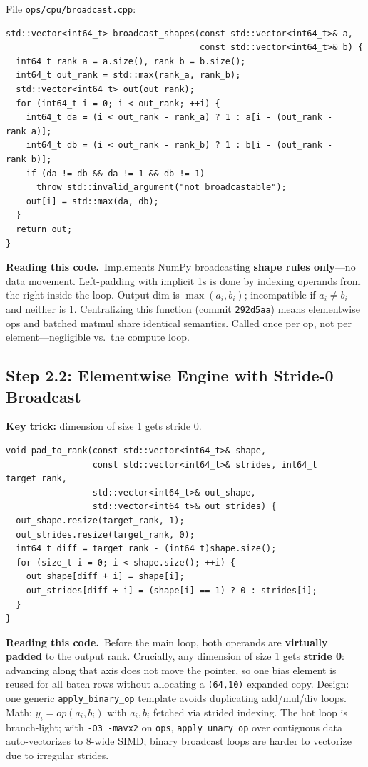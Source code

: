 \documentclass[11pt,a4paper]{article}
\newcommand{\explain}{\par\smallskip\noindent}
\newcommand{\exhead}{\textbf{Reading this code.}\ }
\begin{document}
File \texttt{ops/cpu/broadcast.cpp}:
\begin{lstlisting}[style=cpp]
std::vector<int64_t> broadcast_shapes(const std::vector<int64_t>& a,
                                      const std::vector<int64_t>& b) {
  int64_t rank_a = a.size(), rank_b = b.size();
  int64_t out_rank = std::max(rank_a, rank_b);
  std::vector<int64_t> out(out_rank);
  for (int64_t i = 0; i < out_rank; ++i) {
    int64_t da = (i < out_rank - rank_a) ? 1 : a[i - (out_rank - rank_a)];
    int64_t db = (i < out_rank - rank_b) ? 1 : b[i - (out_rank - rank_b)];
    if (da != db && da != 1 && db != 1)
      throw std::invalid_argument("not broadcastable");
    out[i] = std::max(da, db);
  }
  return out;
}
\end{lstlisting}
\explain\exhead Implements NumPy broadcasting \textbf{shape rules only}---no data movement.
Left-padding with implicit 1s is done by indexing operands from the right inside the loop.
Output dim is $\max(a_i,b_i)$; incompatible if $a_i \neq b_i$ and neither is 1. Centralizing
this function (commit \texttt{292d5aa}) means elementwise ops and batched matmul share identical
semantics. Called once per op, not per element---negligible vs.\ the compute loop.

\subsection{Step 2.2: Elementwise Engine with Stride-0 Broadcast}

\textbf{Key trick:} dimension of size 1 gets stride 0.

\begin{lstlisting}[style=cpp]
void pad_to_rank(const std::vector<int64_t>& shape,
                 const std::vector<int64_t>& strides, int64_t target_rank,
                 std::vector<int64_t>& out_shape,
                 std::vector<int64_t>& out_strides) {
  out_shape.resize(target_rank, 1);
  out_strides.resize(target_rank, 0);
  int64_t diff = target_rank - (int64_t)shape.size();
  for (size_t i = 0; i < shape.size(); ++i) {
    out_shape[diff + i] = shape[i];
    out_strides[diff + i] = (shape[i] == 1) ? 0 : strides[i];
  }
}
\end{lstlisting}
\explain\exhead Before the main loop, both operands are \textbf{virtually padded} to the output
rank. Crucially, any dimension of size 1 gets \textbf{stride 0}: advancing along that axis
does not move the pointer, so one bias element is reused for all batch rows without allocating
a \texttt{(64,10)} expanded copy. Design: one generic \texttt{apply\_binary\_op} template
avoids duplicating add/mul/div loops. Math: $y_i = op(a_i, b_i)$ with $a_i,b_i$ fetched via
strided indexing. The hot loop is branch-light; with \texttt{-O3 -mavx2} on \texttt{ops},
\texttt{apply\_unary\_op} over contiguous data auto-vectorizes to 8-wide SIMD; binary broadcast
loops are harder to vectorize due to irregular strides.
\end{document}
